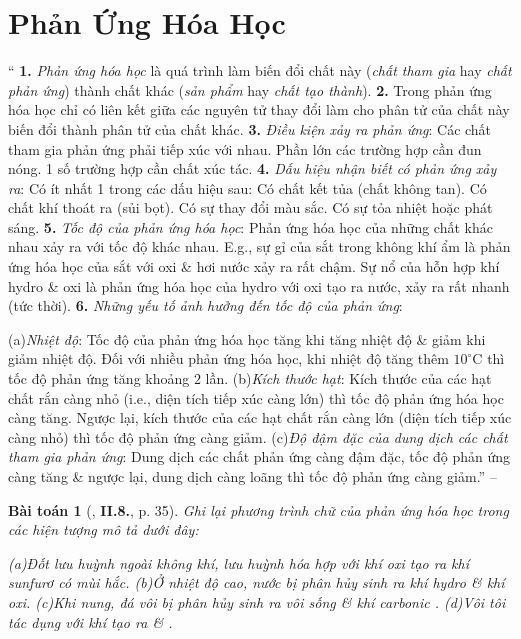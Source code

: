 \documentclass{article}
\numberwithin{equation}{section}
\newtheorem{baitoan}{Bài toán}
\begin{document}



\section{Phản Ứng Hóa Học}
``
	{\bf 1.} \textit{Phản ứng hóa học} là quá trình làm biến đổi chất này (\textit{chất tham gia} hay \textit{chất phản ứng}) thành chất khác (\textit{sản phẩm} hay \textit{chất tạo thành}).
	{\bf 2.} Trong phản ứng hóa học chỉ có liên kết giữa các nguyên tử thay đổi làm cho phân tử của chất này biến đổi thành phân tử của chất khác.
	{\bf 3.} \textit{Điều kiện xảy ra phản ứng}: Các chất tham gia phản ứng phải tiếp xúc với nhau. Phần lớn các trường hợp cần đun nóng. 1 số trường hợp cần chất xúc tác.
	{\bf 4.} \textit{Dấu hiệu nhận biết có phản ứng xảy ra}: Có ít nhất 1 trong các dấu hiệu sau: Có chất kết tủa (chất không tan). Có chất khí thoát ra (sủi bọt). Có sự thay đổi màu sắc. Có sự tỏa nhiệt hoặc phát sáng.
	{\bf 5.} \textit{Tốc độ của phản ứng hóa học}: Phản ứng hóa học của những chất khác nhau xảy ra với tốc độ khác nhau. E.g., sự gỉ của sắt trong không khí ẩm là phản ứng hóa học của sắt với oxi \& hơi nước xảy ra rất chậm. Sự nổ của hỗn hợp khí hydro \& oxi là phản ứng hóa học của hydro với oxi tạo ra nước, xảy ra rất nhanh (tức thời).
	{\bf 6.} \textit{Những yếu tố ảnh hưởng đến tốc độ của phản ứng}:
	
		(a)\textit{Nhiệt độ}: Tốc độ của phản ứng hóa học tăng khi tăng nhiệt độ \& giảm khi giảm nhiệt độ. Đối với nhiều phản ứng hóa học, khi nhiệt độ tăng thêm $10^\circ$C thì tốc độ phản ứng tăng khoảng $2$ lần.
		(b)\textit{Kích thước hạt}: Kích thước của các hạt chất rắn càng nhỏ (i.e., diện tích tiếp xúc càng lớn) thì tốc độ phản ứng hóa học càng tăng. Ngược lại, kích thước của các hạt chất rắn càng lớn (diện tích tiếp xúc càng nhỏ) thì tốc độ phản ứng càng giảm.
		(c)\textit{Độ đậm đặc của dung dịch các chất tham gia phản ứng}: Dung dịch các chất phản ứng càng đậm đặc, tốc độ phản ứng càng tăng \& ngược lại, dung dịch càng loãng thì tốc độ phản ứng càng giảm.'' -- \cite[p. 34]{Truong_BTNC_Hoa_Hoc_8_2022}
		


\begin{baitoan}[\cite{Truong_BTNC_Hoa_Hoc_8_2022}, \textbf{II.8.}, p. 35]
	Ghi lại phương trình chữ của phản ứng hóa học trong các hiện tượng mô tả dưới đây:
	
		(a)Đốt lưu huỳnh ngoài không khí, lưu huỳnh hóa hợp với khí oxi tạo ra khí sunfurơ \emph{} có mùi hắc.
		(b)Ở nhiệt độ cao, nước bị phân hủy sinh ra khí hydro \& khí oxi.
		(c)Khi nung, đá vôi \emph{} bị phân hủy sinh ra vôi sống \emph{} \& khí carbonic \emph{}.
		(d)Vôi tôi \emph{} tác dụng với khí \emph{} tạo ra \emph{} \& \emph{}.
	
\end{baitoan}
\end{document}
